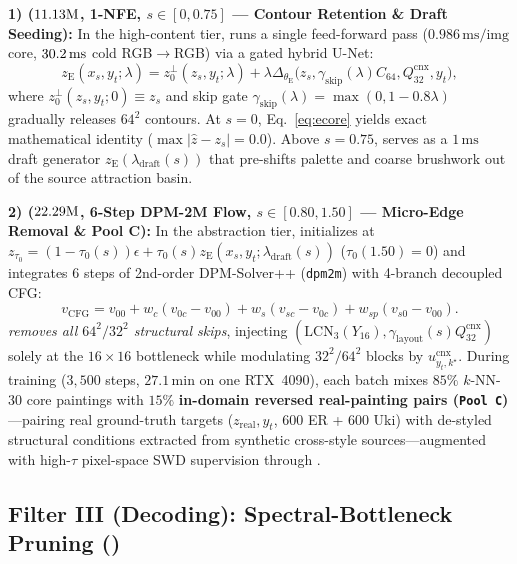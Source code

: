 \documentclass[conference]{IEEEtran}
\begin{document}
\textbf{1) \methodecore{} ($11.13\text{M}$, 1-NFE, $s \in [0, 0.75]$ --- Contour Retention \& Draft Seeding):}
In the high-content tier, \textbf{\methodecore} runs a single feed-forward pass ($0.986\,\text{ms/img}$ core, $30.2\,\text{ms}$ cold RGB$\to$RGB) via a gated hybrid U-Net:
\begin{equation}
z_{\mathrm{E}}(x_s, y_t; \lambda) \!=\! z_0^\perp(z_s, y_t; \lambda) + \lambda \Delta_{\theta_{\mathrm{E}}}\!\big(z_s, \gamma_{\mathrm{skip}}(\lambda) C_{64}, Q_{32}^{\mathrm{cnx}}, y_t\big),
\label{eq:ecore}
\end{equation}
where $z_0^\perp(z_s,y_t;0)\equiv z_s$ and skip gate $\gamma_{\mathrm{skip}}(\lambda)=\max(0, 1-0.8\lambda)$ gradually releases $64^2$ contours. At $s=0$, Eq.~\eqref{eq:ecore} yields exact mathematical identity ($\max\lvert\hat{z}-z_s\rvert=0.0$). Above $s=0.75$, \textbf{\methodecore} serves as a $1\,\text{ms}$ draft generator $z_{\mathrm{E}}(\lambda_{\mathrm{draft}}(s))$ that pre-shifts palette and coarse brushwork out of the source attraction basin.

\textbf{2) \methodpcore{} ($22.29\text{M}$, 6-Step DPM-2M Flow, $s \in [0.80, 1.50]$ --- Micro-Edge Removal \& Pool C):}
In the abstraction tier, \textbf{\methodpcore} initializes at $z_{\tau_0} = (1-\tau_0(s))\epsilon + \tau_0(s) z_{\mathrm{E}}(x_s, y_t; \lambda_{\mathrm{draft}}(s))$ ($\tau_0(1.50)=0$) and integrates 6 steps of 2nd-order DPM-Solver++ (\texttt{dpm2m}) with 4-branch decoupled CFG:
\begin{equation}
v_{\mathrm{CFG}} = v_{00} + w_c(v_{0c}\!-\!v_{00}) + w_s(v_{sc}\!-\!v_{0c}) + w_{sp}(v_{s0}\!-\!v_{00}).
\label{eq:pcore-cfg}
\end{equation}
\textbf{\methodpcore} \emph{removes all $64^2/32^2$ structural skips}, injecting $(\mathrm{LCN}_3(Y_{16}), \gamma_{\mathrm{layout}}(s) Q_{32}^{\mathrm{cnx}})$ solely at the $16\times 16$ bottleneck while modulating $32^2/64^2$ blocks by $u_{y_t,k^\star}^{\mathrm{cnx}}$. During training ($3{,}500$ steps, $27.1\,\text{min}$ on one RTX~4090), each batch mixes $85\%$ $k$-NN-30 core paintings with $15\%$ \textbf{in-domain reversed real-painting pairs (\texttt{Pool C})}---pairing real ground-truth targets ($z_{\mathrm{real}}, y_t$, 600 ER + 600 Uki) with de-styled structural conditions extracted from synthetic cross-style sources---augmented with high-$\tau$ pixel-space SWD supervision through \textbf{\methoddec}.

\subsection{Filter III (Decoding): Spectral-Bottleneck Pruning (\methoddec)}
\label{sec:decoder}
\end{document}
